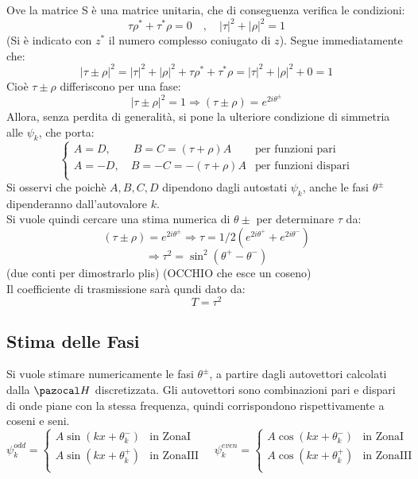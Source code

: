 %
Ove la matrice S è una matrice unitaria, che di conseguenza verifica le condizioni:
$$ \tau\rho^* + \tau^*\rho = 0 \quad,\quad |\tau|^2 + |\rho|^2 = 1$$
(Si è indicato con $z^*$ il numero complesso coniugato di $z$). Segue immediatamente che:
$$ |\tau \pm \rho|^2 = |\tau|^2 + |\rho|^2 + \tau\rho^* + \tau^*\rho = |\tau|^2 + |\rho|^2 + 0 = 1$$
Cioè $\tau \pm \rho$ differiscono per una fase:
$$ |\tau \pm \rho|^2 = 1 \Rightarrow (\tau \pm \rho) = e^{2i\theta^\pm}$$
%
Allora, senza perdita di generalità, si pone la ulteriore condizione di simmetria alle $\psi_k$, che porta:
$$\begin{cases}
    A = D, \qquad  B = C = (\tau + \rho)A &\mbox{per funzioni pari} \\
    A = -D, \quad B = -C = -(\tau + \rho)A &\mbox{per funzioni dispari}\\
\end{cases}$$
%
Si osservi che poichè $A,B,C,D$ dipendono dagli autostati $\psi_k$, anche le fasi $\theta^\pm$ dipenderanno dall'autovalore $k$.\\
Si vuole quindi cercare una stima numerica di $\theta\pm$ per determinare $\tau$ da:
    $$ (\tau \pm \rho) = e^{2i\theta^\pm} \Rightarrow \tau = 1/2(e^{2i\theta^+}+e^{2i\theta^-})$$
    $$ \Rightarrow \tau^2 = \sin^2(\theta^+ - \theta^-)$$
(due conti per dimostrarlo plis) (OCCHIO che esce un coseno)
\\
Il coefficiente di trasmissione sarà qundi dato da:
    $$T = \tau^2$$

\subsection*{Stima delle Fasi}
Si vuole stimare numericamente le fasi $\theta^\pm$, a partire dagli autovettori
calcolati dalla $\Hh$ discretizzata. Gli autovettori sono combinazioni pari e dispari
di onde piane con la stessa frequenza, quindi corrispondono rispettivamente a coseni e seni.
    $$ \psi_k^{odd} = \begin{cases}
        A\sin(kx + \theta^-_k) & \mbox{in ZonaI} \\
        A\sin(kx + \theta^+_k) & \mbox{in ZonaIII} \\
    \end{cases}
    \quad
    \psi_k^{even} = \begin{cases}
        A\cos(kx + \theta^-_k) & \mbox{in ZonaI} \\
        A\cos(kx + \theta^+_k) & \mbox{in ZonaIII} \\
    \end{cases}
    $$

